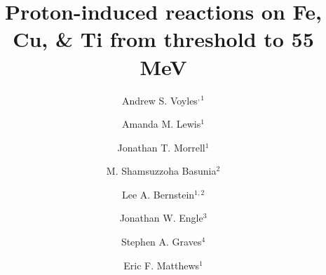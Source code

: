 \documentclass[onecolumn,epjc3]{svjour3}
\begin{document}
% 
% 
% 
% 


\title{Proton-induced reactions on Fe, Cu, \& Ti from threshold to 55 MeV%
}


\author{Andrew S. Voyles$^{,1}$
        \and
        Amanda M. Lewis$^{1}$
        \and
        Jonathan T. Morrell$^{1}$
        \and
        M. Shamsuzzoha Basunia$^{2}$
        \and
        Lee A. Bernstein$^{1,2}$
        \and
        Jonathan W. Engle$^{3}$
        \and
        Stephen A. Graves$^{4}$
        \and
        Eric F. Matthews$^{1}$
}







\end{document}
